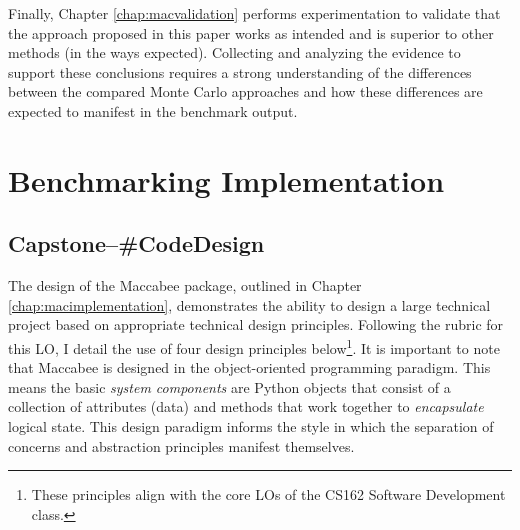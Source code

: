 \documentclass[../main.tex]{subfiles}
\begin{document}
Finally, Chapter \ref{chap:macvalidation} performs experimentation to validate that the approach proposed in this paper works as intended and is superior to other methods (in the ways expected). Collecting and analyzing the evidence to support these conclusions requires a strong understanding of the differences between the compared Monte Carlo approaches and how these differences are expected to manifest in the benchmark output.


\section{Benchmarking Implementation}

\subsection*{\textbf{Capstone--\#CodeDesign}}
\label{lo:CodeDesign}

The design of the Maccabee package, outlined in Chapter \ref{chap:macimplementation}, demonstrates the ability to design a large technical project based on appropriate technical design principles. Following the rubric for this LO, I detail the use of four design principles below\footnote{These principles align with the core LOs of the CS162 Software Development class.}. It is important to note that Maccabee is designed in the object-oriented programming paradigm. This means the basic \textit{system components} are Python objects that consist of a collection of attributes (data) and methods that work together to \textit{encapsulate} logical state. This design paradigm informs the style in which the separation of concerns and abstraction principles manifest themselves.
\end{document}
